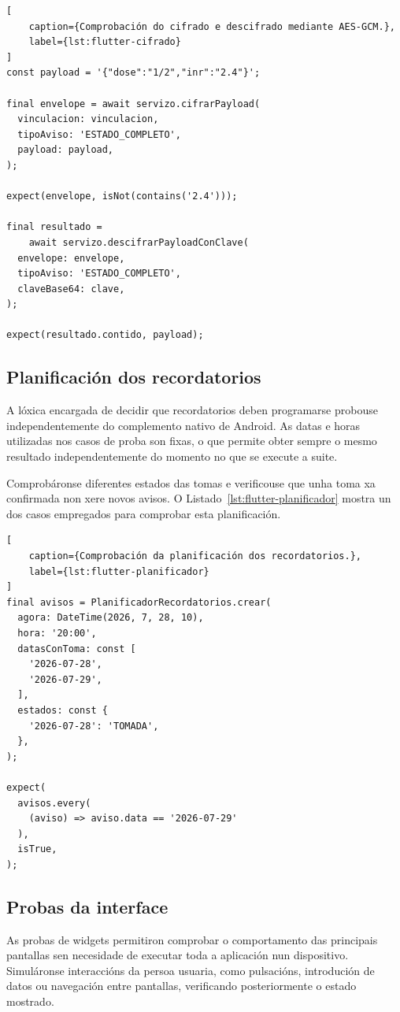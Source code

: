 \begin{lstlisting}[
    caption={Comprobación do cifrado e descifrado mediante AES-GCM.},
    label={lst:flutter-cifrado}
]
const payload = '{"dose":"1/2","inr":"2.4"}';

final envelope = await servizo.cifrarPayload(
  vinculacion: vinculacion,
  tipoAviso: 'ESTADO_COMPLETO',
  payload: payload,
);

expect(envelope, isNot(contains('2.4')));

final resultado =
    await servizo.descifrarPayloadConClave(
  envelope: envelope,
  tipoAviso: 'ESTADO_COMPLETO',
  claveBase64: clave,
);

expect(resultado.contido, payload);
\end{lstlisting}


\subsection{Planificación dos recordatorios}

A lóxica encargada de decidir que recordatorios deben programarse probouse independentemente do complemento nativo de Android. As datas e horas utilizadas nos casos de proba son fixas, o que permite obter sempre o mesmo resultado independentemente do momento no que se execute a suite.

Comprobáronse diferentes estados das tomas e verificouse que unha toma xa confirmada non xere novos avisos. O Listado~\ref{lst:flutter-planificador} mostra un dos casos empregados para comprobar esta planificación.

\begin{lstlisting}[
    caption={Comprobación da planificación dos recordatorios.},
    label={lst:flutter-planificador}
]
final avisos = PlanificadorRecordatorios.crear(
  agora: DateTime(2026, 7, 28, 10),
  hora: '20:00',
  datasConToma: const [
    '2026-07-28',
    '2026-07-29',
  ],
  estados: const {
    '2026-07-28': 'TOMADA',
  },
);

expect(
  avisos.every(
    (aviso) => aviso.data == '2026-07-29'
  ),
  isTrue,
);
\end{lstlisting}


\subsection{Probas da interface}

As probas de widgets permitiron comprobar o comportamento das principais pantallas sen necesidade de executar toda a aplicación nun dispositivo. Simuláronse interaccións da persoa usuaria, como pulsacións, introdución de datos ou navegación entre pantallas, verificando posteriormente o estado mostrado.

